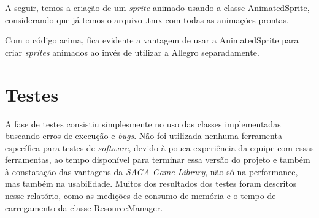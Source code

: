 \par 
A seguir, temos a criação de um \textit{sprite} animado usando a classe AnimatedSprite, considerando que já temos o arquivo .tmx com todas as animações prontas.
%

%
Com o código acima, fica evidente a vantagem de usar a AnimatedSprite para criar \textit{sprites} animados ao invés de utilizar a Allegro separadamente.
%
%
%
\section{Testes}
%
A fase de testes consistiu simplesmente no uso das classes implementadas buscando erros de execução e \textit{bugs}. Não foi utilizada nenhuma ferramenta específica para testes de \textit{software}, devido à pouca experiência da equipe com essas ferramentas, ao tempo disponível para terminar essa versão do projeto e também à constatação das vantagens da \textit{SAGA Game Library}, não só na performance, mas também na usabilidade. Muitos dos resultados dos testes foram descritos nesse relatório, como as medições de consumo de memória e o tempo de carregamento da classe ResourceManager. 
%

